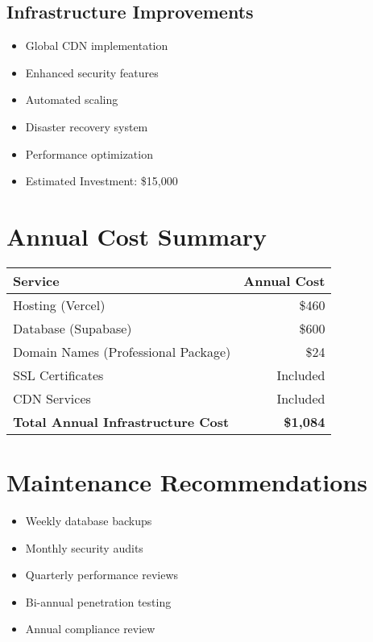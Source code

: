 \documentclass[11pt,a4paper]{article}
\begin{document}
\subsection{Infrastructure Improvements}
\begin{itemize}[leftmargin=*]
    \item Global CDN implementation
    \item Enhanced security features
    \item Automated scaling
    \item Disaster recovery system
    \item Performance optimization
    \item Estimated Investment: \$15,000
\end{itemize}

\section{Annual Cost Summary}
\begin{center}
\begin{tabular}{lr}
\toprule
\textbf{Service} & \textbf{Annual Cost} \\
\midrule
Hosting (Vercel) & \$460 \\
Database (Supabase) & \$600 \\
Domain Names (Professional Package) & \$24 \\
SSL Certificates & Included \\
CDN Services & Included \\
\midrule
\textbf{Total Annual Infrastructure Cost} & \textbf{\$1,084} \\
\bottomrule
\end{tabular}
\end{center}

\section{Maintenance Recommendations}
\begin{itemize}[leftmargin=*]
    \item Weekly database backups
    \item Monthly security audits
    \item Quarterly performance reviews
    \item Bi-annual penetration testing
    \item Annual compliance review
\end{itemize}
\end{document}
